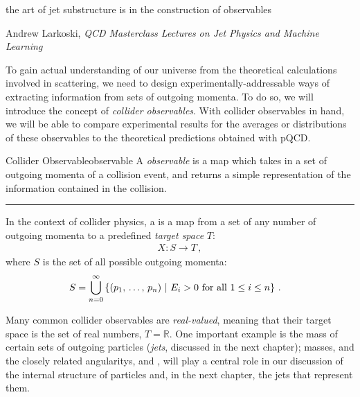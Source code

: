 \epigraph{
    the art of jet substructure is in the construction of observables
}{
    Andrew Larkoski, \textit{QCD Masterclass Lectures on Jet Physics and Machine Learning} \cite{Larkoski:2024uoc}
}

To gain actual understanding of our universe from the theoretical calculations involved in scattering, we need to design experimentally-addressable ways of extracting information from sets of outgoing momenta.
%
To do so, we will introduce the concept of \textit{collider observables}.
%
With collider observables in hand, we will be able to compare experimental results for the averages or distributions of these observables to the theoretical predictions obtained with pQCD.

\begin{definitionbox}{Collider Observable}{observable}
    A \emph{\gls{observable}} is a map which takes in a set of outgoing momenta of a collision event, and returns a simple representation of the information contained in the collision.

    \vspace{7pt}
    \hrule
    \vspace{7pt}

    In the context of collider physics, a  is a map from a set of any number of outgoing momenta to a predefined \textit{target space} \(T\):
    \begin{align}
        X: S \to T
        \,,
    \end{align}
    where \(S\) is the set of all possible outgoing momenta:
    \begin{align}
        S &= \bigcup_{n=0}^\infty \left\{
            (p_1, \,\dots,\, p_n)
            \,\,
            |
            \,\,
            E_i > 0 \text{ for all } 1 \leq i \leq n
        \right\}
        \,.
    \end{align}
\end{definitionbox}
Many common collider observables are \textit{real-valued}, meaning that their target space is the set of real numbers, \(T = \mathbb{R}\).
%
One important example is the mass of certain sets of outgoing particles (\textit{jets}, discussed in the next chapter);
%
masses, and the closely related \glspl{angularity}, and , will play a central role in our discussion of the internal structure of particles and, in the next chapter, the jets that represent them.
